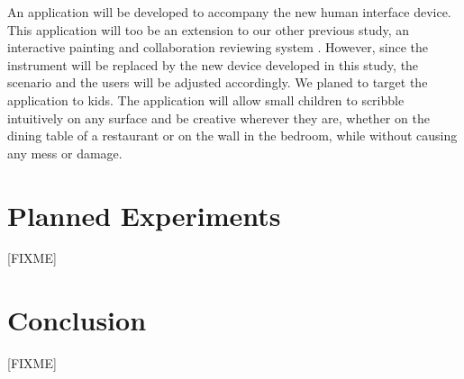 \documentclass{acm_proc_article-sp}
\begin{document}
An application will be developed to accompany the new human interface
device. This application will too be an extension to our other
previous study, an interactive painting and collaboration reviewing
system \citep{baba:abeyrathne}. However, since the instrument will be
replaced by the new device developed in this study, the scenario and
the users will be adjusted accordingly. We planed to target the
application to kids. The application will allow small children to
scribble intuitively on any surface and be creative wherever they are,
whether on the dining table of a restaurant or on the wall in the
bedroom, while without causing any mess or damage.



\section{Planned Experiments}
\label{sec:experiment}
[FIXME]


\section{Conclusion}
\label{sec:conclusion}
[FIXME]




\end{document}
